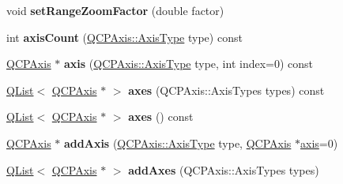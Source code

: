 \begin{DoxyCompactItemize}
\item 
void {\bfseries set\+Range\+Zoom\+Factor} (double factor)\hypertarget{class_q_c_p_axis_rect_ae83d187b03fc6fa4f00765ad50cd3fc3}{}\label{class_q_c_p_axis_rect_ae83d187b03fc6fa4f00765ad50cd3fc3}

\item 
int {\bfseries axis\+Count} (\hyperlink{class_q_c_p_axis_ae2bcc1728b382f10f064612b368bc18a}{Q\+C\+P\+Axis\+::\+Axis\+Type} type) const \hypertarget{class_q_c_p_axis_rect_a16e3e4646e52e4b5d5b865076c29ae58}{}\label{class_q_c_p_axis_rect_a16e3e4646e52e4b5d5b865076c29ae58}

\item 
\hyperlink{class_q_c_p_axis}{Q\+C\+P\+Axis} $\ast$ {\bfseries axis} (\hyperlink{class_q_c_p_axis_ae2bcc1728b382f10f064612b368bc18a}{Q\+C\+P\+Axis\+::\+Axis\+Type} type, int index=0) const \hypertarget{class_q_c_p_axis_rect_a24fb41092c710f1d2b550e318cec642a}{}\label{class_q_c_p_axis_rect_a24fb41092c710f1d2b550e318cec642a}

\item 
\hyperlink{class_q_list}{Q\+List}$<$ \hyperlink{class_q_c_p_axis}{Q\+C\+P\+Axis} $\ast$ $>$ {\bfseries axes} (Q\+C\+P\+Axis\+::\+Axis\+Types types) const \hypertarget{class_q_c_p_axis_rect_af0e1a46e676e1cb7116765ddcab7089f}{}\label{class_q_c_p_axis_rect_af0e1a46e676e1cb7116765ddcab7089f}

\item 
\hyperlink{class_q_list}{Q\+List}$<$ \hyperlink{class_q_c_p_axis}{Q\+C\+P\+Axis} $\ast$ $>$ {\bfseries axes} () const \hypertarget{class_q_c_p_axis_rect_af19d8f81290619394c6989962ce62d30}{}\label{class_q_c_p_axis_rect_af19d8f81290619394c6989962ce62d30}

\item 
\hyperlink{class_q_c_p_axis}{Q\+C\+P\+Axis} $\ast$ {\bfseries add\+Axis} (\hyperlink{class_q_c_p_axis_ae2bcc1728b382f10f064612b368bc18a}{Q\+C\+P\+Axis\+::\+Axis\+Type} type, \hyperlink{class_q_c_p_axis}{Q\+C\+P\+Axis} $\ast$\hyperlink{class_q_c_p_axis_rect_a560de44e47a4af0f86c59102a094b1e4}{axis}=0)\hypertarget{class_q_c_p_axis_rect_abbff863e639573bf5ba7224b5411912e}{}\label{class_q_c_p_axis_rect_abbff863e639573bf5ba7224b5411912e}

\item 
\hyperlink{class_q_list}{Q\+List}$<$ \hyperlink{class_q_c_p_axis}{Q\+C\+P\+Axis} $\ast$ $>$ {\bfseries add\+Axes} (Q\+C\+P\+Axis\+::\+Axis\+Types types)\hypertarget{class_q_c_p_axis_rect_afbb5e6dc35195ec1072f28c02cf715d8}{}\label{class_q_c_p_axis_rect_afbb5e6dc35195ec1072f28c02cf715d8}


\end{DoxyCompactItemize}
